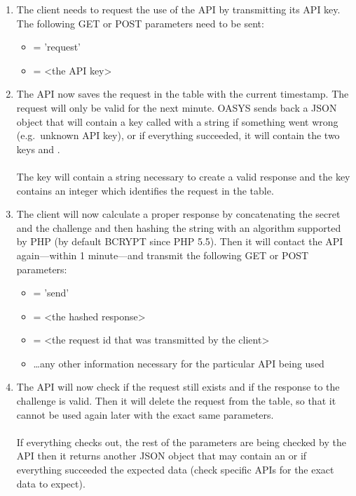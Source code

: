 \documentclass[12pt]{article} %
\begin{document}
    \begin{enumerate}
        \item The client needs to request the use of the API by transmitting its API key.
        The following GET or POST parameters need to be sent:
        \begin{itemize}
            \item {} = 'request'
            \item {} = <the API key>
        \end{itemize}
        \item The API now saves the request in the  table with the current timestamp.
        The request will only be valid for the next minute.
        OASYS sends back a JSON object that will contain a key called  with a string if something went wrong (e.g.\ unknown API key), or if everything succeeded, it will contain the two keys  and .\\\\
        The  key will contain a string necessary to create a valid response and the  key contains an integer which identifies the request in the  table.
        \item The client will now calculate a proper response by concatenating the secret and the challenge and then hashing the string with an algorithm supported by PHP (by default BCRYPT since PHP 5.5).
        Then it will contact the API again—within 1 minute—and transmit the following GET or POST parameters:
        \begin{itemize}
            \item {} = 'send'
            \item {} = <the hashed response>
            \item {} = <the request id that was transmitted by the client>
            \item \ldots any other information necessary for the particular API being used
        \end{itemize}
        \item The API will now check if the request still exists and if the response to the challenge is valid.
        Then it will delete the request from the table, so that it cannot be used again later with the exact same parameters.\\\\
        If everything checks out, the rest of the parameters are being checked by the API then it returns another JSON object that may contain an  or if everything succeeded the expected data (check specific APIs for the exact data to expect).

    \end{enumerate}
\end{document}
